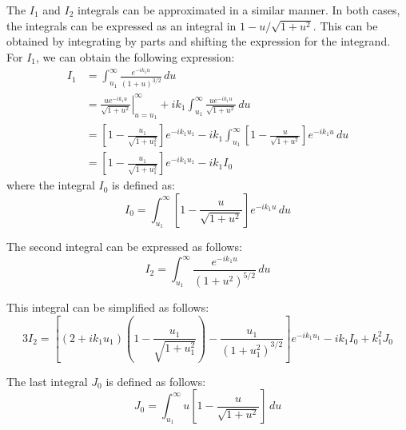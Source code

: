 \documentclass[12pt]{article}
\newcommand{\f}{\frac}
\begin{document}
The $I_{1}$ and $I_{2}$ integrals can be approximated in a similar
manner. In both cases, the integrals can be expressed as an integral
in $1 - u/\sqrt{1 + u^2}$. This can be obtained by integrating by
parts and shifting the expression for the integrand. For $I_{1}$, 
we can obtain the following expression:
\begin{equation*}
  \begin{aligned}
    I_{1} & = \int_{u_{1}}^{\infty} \f{e^{-ik_1u}}{(1 + u)^{3/2}} \, du \\
    & = \left. \f{u e^{-ik_1 u}}{\sqrt{1 + u^2}} \right|_{u=u_{1}}^{\infty} +
    ik_{1} \int_{u_{1}}^{\infty} \f{ue^{-ik_1 u}}{\sqrt{1 + u^2}} \, du \\
    & = \left[1 - \f{u_{1}}{\sqrt{1 + u_1^2}} \right]e^{-ik_{1}u_{1}} -
    ik_{1} \int_{u_{1}}^{\infty} \left[1 - \f{u}{\sqrt{1 + u^2}} \right] e^{-ik_1 u} \, du  \\
    & = \left[1 - \f{u_{1}}{\sqrt{1 + u_1^2}} \right]e^{-ik_{1}u_{1}} - ik_{1} I_{0}
  \end{aligned}
\end{equation*}
where the integral $I_{0}$ is defined as:
\begin{equation*}
  I_{0} = \int_{u_{1}}^{\infty} \left[ 1 - \f{u}{\sqrt{1 + u^2}} \right] e^{-ik_1 u} \, du
\end{equation*}

The second integral can be expressed as follows:
\begin{equation*}
    I_{2} = \int_{u_{1}}^{\infty} \f{e^{-ik_1u}}{(1 + u^2)^{5/2}} \, du 
\end{equation*}

This integral can be simplified as follows:
%
\begin{equation*}
  3 I_{2} = \left[ (2 + ik_{1}u_{1}) \left( 1 - \f{u_{1}}{\sqrt{1 + u_{1}^2}}\right) 
    - \f{u_{1}}{(1 + u_{1}^2)^{3/2}}\right]e^{-ik_{1}u_{1}} - ik_{1} I_{0} + k_{1}^2J_{0}
\end{equation*}

The last integral $J_{0}$ is defined as follows:
%
\begin{equation*}
  J_{0} = \int_{u_{1}}^{\infty} u \left[ 1 - \f{u}{\sqrt{1 + u^2}} \right] \, du
\end{equation*}
\end{document}
